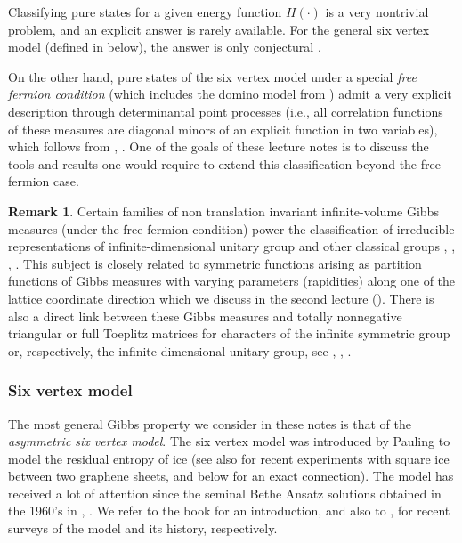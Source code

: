 \documentclass[letterpaper,11pt,oneside,reqno]{article}
\numberwithin{equation}{section}
\theoremstyle{definition}
\newtheorem{remark}[proposition]{Remark}
\theoremstyle{remark}
\begin{document}
Classifying pure states for a given energy function $H(\cdot)$ is a very
nontrivial problem, and an 
explicit answer is rarely available. 
For the general six vertex model 
(defined in  below),
the answer is only conjectural
\cite{reshetikhin2010lectures}.

On the other hand, pure states of the six vertex model 
under a special
\emph{free fermion condition}
(which includes the domino model from )
admit a very explicit description through
determinantal point processes 
(i.e., all correlation functions
of these measures are diagonal minors
of an explicit function in two variables),
which follows from
\cite{Sheffield2008}, 
\cite{KOS2006}.
One of the goals of these lecture notes is to discuss 
the tools and results one would require to extend this classification
beyond the free fermion case.


\begin{remark}
	\label{rmk:inf_Gibbs}
	Certain families of 
	non translation invariant
	infinite-volume
	Gibbs measures (under the free fermion condition)
	power the
	classification of irreducible representations of
	infinite-dimensional unitary group
	and other classical groups
	\cite{Voiculescu1976},
	\cite{VK82CharactersU},
	\cite{BorodinOlsh2011GT},
	\cite{Petrov2012GT}.
	This subject is closely related to symmetric
	functions arising as partition functions
	of Gibbs measures with 
	varying parameters (rapidities)
	along one of the lattice coordinate
	direction which we discuss in the second lecture ().
	There is also a direct link between these Gibbs measures and totally nonnegative triangular or
	full Toeplitz matrices for characters of the infinite
	symmetric group or, respectively, the
	infinite-dimensional unitary group, see \cite{AESW51},
	\cite{Edrei53}, \cite{Boyer1983}.
\end{remark}

\subsubsection{Six vertex model}
\label{subsub:6v_model}

The most general Gibbs property we consider in these notes is that of the 
\emph{asymmetric six vertex model}. 
The six vertex model 
was introduced by Pauling to model
the residual entropy of ice \cite{pauling1935structure}
(see also 
\cite{Nature_square_ice}
for recent experiments
with square ice between two graphene sheets, and  below for an exact connection).
The model
has received a lot of attention since the seminal Bethe Ansatz solutions obtained in the 1960's in
\cite{Lieb1967SixVertex}, \cite{YangYang1966}.
We refer to the book 
\cite{baxter2007exactly} for an introduction, and also to
\cite{reshetikhin2010lectures}, \cite{BramwellHarris2020} for recent surveys of the 
model and its history, respectively.
\end{document}
